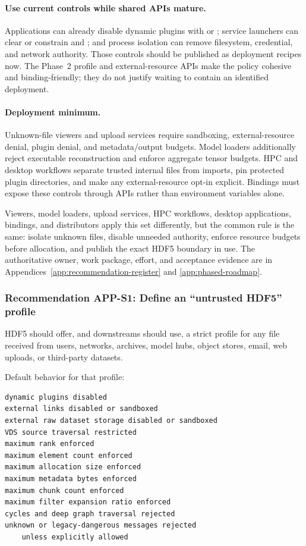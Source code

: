 \documentclass[../main.tex]{subfiles}
\begin{document}
\paragraph{Use current controls while shared APIs mature.}
Applications can already disable dynamic plugins with
 or ; service
launchers can clear or constrain  and
; and process isolation can remove filesystem,
credential, and network authority. Those controls should be published as
deployment recipes now. The Phase~2 profile and external-resource APIs make the
policy cohesive and binding-friendly; they do not justify waiting to contain an
identified deployment.

\paragraph{Deployment minimum.}
Unknown-file viewers and upload services require sandboxing, external-resource
denial, plugin denial, and metadata/output budgets. Model loaders additionally
reject executable reconstruction and enforce aggregate tensor budgets. HPC and
desktop workflows separate trusted internal files from imports, pin protected
plugin directories, and make any external-resource opt-in explicit. Bindings
must expose these controls through APIs rather than environment variables alone.

Viewers, model loaders, upload services, HPC workflows, desktop applications,
bindings, and distributors apply this set differently, but the common rule is
the same: isolate unknown files, disable unneeded authority, enforce resource
budgets before allocation, and publish the exact HDF5 boundary in use. The
authoritative owner, work package, effort, and acceptance evidence are in
Appendices~\ref{app:recommendation-register} and
\ref{app:phased-roadmap}.

\iffalse
\subsubsection*{Recommendation APP-S1: Define an “untrusted HDF5” profile}

HDF5 should offer, and downstreams should use, a strict profile
for any file received from users, networks, archives, model hubs,
object stores, email, web uploads, or third-party datasets.

Default behavior for that profile:
\begin{verbatim}
dynamic plugins disabled
external links disabled or sandboxed
external raw dataset storage disabled or sandboxed
VDS source traversal restricted
maximum rank enforced
maximum element count enforced
maximum allocation size enforced
maximum metadata bytes enforced
maximum chunk count enforced
maximum filter expansion ratio enforced
cycles and deep graph traversal rejected
unknown or legacy-dangerous messages rejected
    unless explicitly allowed    
\end{verbatim}
\end{document}
